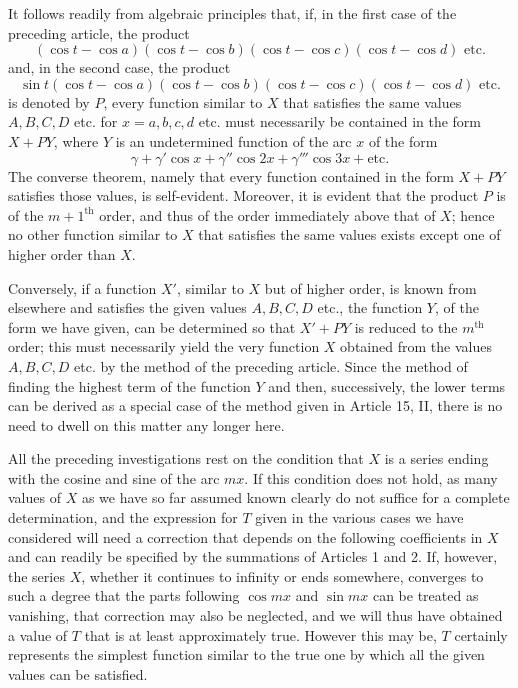\begingroup
\renewcommand{\arraystretch}{1.45}
It follows readily from algebraic principles that, if, in the first case of the preceding article, the product
\[
(\cos t-\cos a)(\cos t-\cos b)(\cos t-\cos c)(\cos t-\cos d)\text{ etc.}
\]
and, in the second case, the product
\[
\sin t(\cos t-\cos a)(\cos t-\cos b)(\cos t-\cos c)(\cos t-\cos d)\text{ etc.}
\]
is denoted by \(P\), every function similar to \(X\) that satisfies the same values
\(A,B,C,D\) etc. for \(x=a,b,c,d\) etc. must necessarily be contained in the form \(X+PY\),
where \(Y\) is an undetermined function of the arc \(x\) of the form
\[
\gamma+\gamma'\cos x+\gamma''\cos 2x+\gamma'''\cos 3x+\text{etc.}
\]
The converse theorem, namely that every function contained in the form \(X+PY\) satisfies those values, is self-evident. Moreover, it is evident that the product
\(P\) is of the \(m+1^{\mathrm{th}}\) order, and thus of the order immediately above that of \(X\); hence no other function
similar to \(X\) that satisfies the same values exists except one of higher order
than \(X\).

Conversely, if a function \(X'\), similar to \(X\) but of higher order,
is known from elsewhere and satisfies the given values \(A,B,C,D\) etc., the function \(Y\),
of the form we have given, can be determined so that \(X'+PY\) is reduced to the
\endgroup
\begingroup
\renewcommand{\arraystretch}{1.45}
\noindent
\(m^{\mathrm{th}}\) order; this must necessarily yield the very function \(X\) obtained from the values \(A,B,C,D\) etc.
by the method of the preceding article. Since the method of finding the highest term
of the function \(Y\) and then, successively, the lower terms can be derived as a special case
of the method given in Article 15, II, there is no need to dwell on this matter
any longer here.

All the preceding investigations rest on the condition that \(X\) is a series ending with the cosine and sine of the arc \(mx\). If this condition does not
hold, as many values of \(X\) as we have so far assumed known clearly do not
suffice for a complete determination, and the expression for \(T\) given in the various cases we have considered will need a correction that depends on the following coefficients
in \(X\) and can readily be specified by the summations of Articles 1 and 2. If, however,
the series \(X\), whether it continues to infinity or ends somewhere, converges to such a degree
that the parts following \(\cos mx\) and \(\sin mx\) can be treated as vanishing,
that correction may also be neglected, and we will thus have obtained a value of \(T\) that is at least approximately
true. However this may be, \(T\) certainly represents the simplest function similar
to the true one by which all the given values can be satisfied.

\endgroup
